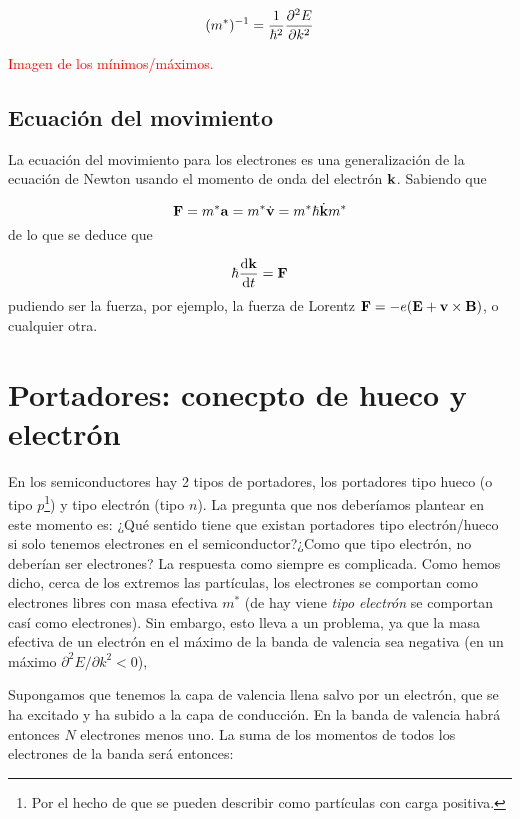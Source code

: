 \begin{equation}
	(m^*)^{-1} = \frac{1}{\hbar^2} \frac{\partial ^2E}{\partial k^2} 
\end{equation}

\begin{Anotacion}
	\textcolor{red}{Imagen de los mínimos/máximos.}
\end{Anotacion}

\subsection{Ecuación del movimiento}

La ecuación del movimiento para los electrones es una generalización de la ecuación de Newton usando el momento de onda del electrón $\mathbf{k}$. Sabiendo que 

\begin{equation}
	\mathbf{F} = m^* \mathbf{a} = m^* \dot{\mathbf{v}} = m^* \hbar \dot{\mathbf{k}}{m^*} 
\end{equation}
de lo que se deduce que 

\begin{equation}
	\hbar \frac{\mathrm{d} \mathbf{k}}{\mathrm{d} t} = \mathbf{F}
\end{equation}
pudiendo ser la fuerza, por ejemplo, la fuerza de Lorentz $\mathbf{F}=-e(\mathbf{E}+\mathbf{v} \times \mathbf{B})$, o cualquier otra.

\section{Portadores: conecpto de hueco y electrón}

En los semiconductores hay 2 tipos de portadores, los portadores tipo hueco (o tipo $p$\footnote{Por el hecho de que se pueden describir como partículas con carga positiva.}) y tipo electrón (tipo $n$). La pregunta que nos deberíamos plantear en este momento es: ¿Qué sentido tiene que existan portadores tipo electrón/hueco si solo tenemos electrones en el semiconductor?¿Como que tipo electrón, no deberían ser electrones? La respuesta como siempre es complicada. Como hemos dicho, cerca de los extremos las partículas, los electrones se comportan como electrones libres con masa efectiva $m^*$ (de hay viene \textit{tipo electrón} se comportan casí como electrones). Sin embargo, esto lleva a un problema, ya que la masa efectiva de un electrón en el máximo de la banda de valencia sea negativa (en un máximo $\partial^2 E/ \partial k^2<0$), 

Supongamos que tenemos la capa de valencia llena salvo por un electrón, que se ha excitado y ha subido a la capa de conducción. En la banda de valencia habrá entonces $N$ electrones menos uno. La suma de los momentos de todos los electrones de la banda será entonces:

